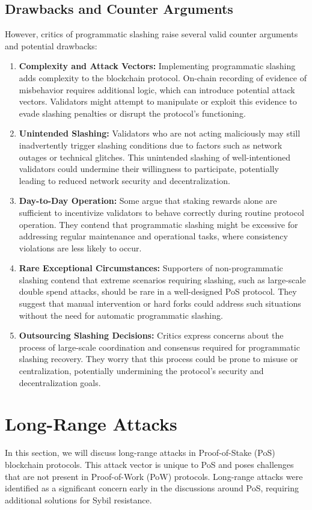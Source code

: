 \subsection{Drawbacks and Counter Arguments}
However, critics of programmatic slashing raise several valid counter arguments and potential drawbacks:
\begin{enumerate}
    \item \textbf{Complexity and Attack Vectors:} Implementing programmatic slashing adds complexity to the blockchain protocol. On-chain recording of evidence of misbehavior requires additional logic, which can introduce potential attack vectors. Validators might attempt to manipulate or exploit this evidence to evade slashing penalties or disrupt the protocol's functioning.
    \item \textbf{Unintended Slashing:} Validators who are not acting maliciously may still inadvertently trigger slashing conditions due to factors such as network outages or technical glitches. This unintended slashing of well-intentioned validators could undermine their willingness to participate, potentially leading to reduced network security and decentralization.
    \item \textbf{Day-to-Day Operation:} Some argue that staking rewards alone are sufficient to incentivize validators to behave correctly during routine protocol operation. They contend that programmatic slashing might be excessive for addressing regular maintenance and operational tasks, where consistency violations are less likely to occur.
    \item \textbf{Rare Exceptional Circumstances:} Supporters of non-programmatic slashing contend that extreme scenarios requiring slashing, such as large-scale double spend attacks, should be rare in a well-designed PoS protocol. They suggest that manual intervention or hard forks could address such situations without the need for automatic programmatic slashing.
    \item \textbf{Outsourcing Slashing Decisions:} Critics express concerns about the process of large-scale coordination and consensus required for programmatic slashing recovery. They worry that this process could be prone to misuse or centralization, potentially undermining the protocol's security and decentralization goals.
\end{enumerate}

\section{Long-Range Attacks}
In this section, we will discuss long-range attacks in Proof-of-Stake (PoS) blockchain protocols. This attack vector is unique to PoS and poses challenges that are not present in Proof-of-Work (PoW) protocols. Long-range attacks were identified as a significant concern early in the discussions around PoS, requiring additional solutions for Sybil resistance.
